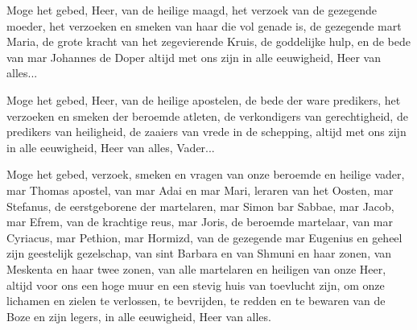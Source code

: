 \documentclass[12pt,twoside,a5paper]{article}
\begin{document}
\begin{halfparskip}
    Moge het gebed, Heer, van de heilige maagd, het verzoek van de gezegende moeder, het verzoeken en smeken van haar die vol genade is, de gezegende mart Maria, de grote kracht van het zegevierende Kruis, de goddelijke hulp, en de bede van mar Johannes de Doper altijd met ons zijn in alle eeuwigheid, Heer van alles...

   Moge het gebed, Heer, van de heilige apostelen, de bede der ware predikers, het verzoeken en smeken der beroemde atleten, de verkondigers van gerechtigheid, de predikers van heiligheid, de zaaiers van vrede in de schepping, altijd met ons zijn in alle eeuwigheid, Heer van alles, Vader...

   Moge het gebed, verzoek, smeken en vragen van onze beroemde en heilige vader, mar Thomas apostel, van mar Adai en mar Mari, leraren van het Oosten, mar Stefanus, de eerstgeborene der martelaren, mar Simon bar Sabbae, mar Jacob, mar Efrem, van de krachtige reus, mar Joris, de beroemde martelaar, van mar Cyriacus, mar Pethion, mar Hormizd, van de gezegende mar Eugenius en geheel zijn geestelijk gezelschap, van sint Barbara en van Shmuni en haar zonen, van Meskenta en haar twee zonen, van alle martelaren en heiligen van onze Heer, altijd voor ons een hoge muur en een stevig huis van toevlucht zijn, om onze lichamen en zielen te verlossen, te bevrijden, te redden en te bewaren van de Boze en zijn legers, in alle eeuwigheid, Heer van alles.
\end{halfparskip}
\end{document}
